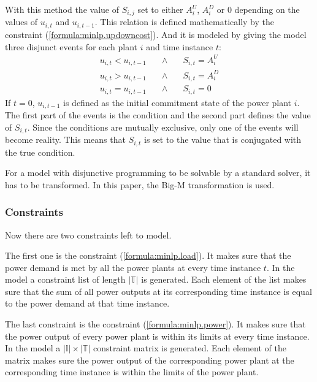 With this method the value of $S_{i, j}$ set to either $A^U_i$, $A^D_i$ or $0$
depending on the values of $u_{i, t}$ and $u_{i, t-1}$.
This relation is defined mathematically by the constraint (\ref{formula:minlp.updowncost}).
And it is modeled by giving the model three disjunct events for each plant $i$ and time instance $t$:
\begin{subequations}
\begin{align}
  u_{i, t} < u_{i, t-1} \quad & \land & \quad S_{i, t} = A^U_i \\
  u_{i, t} > u_{i, t-1} \quad & \land & \quad S_{i, t} = A^D_i \\
  u_{i, t} = u_{i, t-1} \quad & \land & \quad S_{i, t} = 0
\end{align}
\end{subequations}
If $t = 0$, $u_{i, t-1}$ is defined as the initial commitment state of the power plant $i$.
The first part of the events is the condition and the second part defines the value of $S_{i, t}$.
Since the conditions are mutually exclusive,
only one of the events will become reality.
This means that $S_{i, t}$ is set to the value that is conjugated with the true condition.

For a model with disjunctive programming to be solvable by a standard solver,
it has to be transformed.
In this paper, the Big-M transformation is used.
\cite{Trespalacios2015}

\subsubsection{Constraints}

Now there are two constraints left to model.

The first one is the constraint (\ref{formula:minlp.load}).
It makes sure that the power demand is met by all the power plants at every time instance $t$.
In the model a constraint list of length $|\mathbb{T}|$ is generated.
Each element of the list makes sure that the sum of all power outputs at its corresponding time instance
is equal to the power demand at that time instance.

The last constraint is the constraint (\ref{formula:minlp.power}).
It makes sure that the power output of every power plant is within its limits at every time instance.
In the model a $|\mathbb{I}| \times |\mathbb{T}|$ constraint matrix is generated.
Each element of the matrix makes sure the power output of the corresponding power plant
at the corresponding time instance is within the limits of the power plant.

